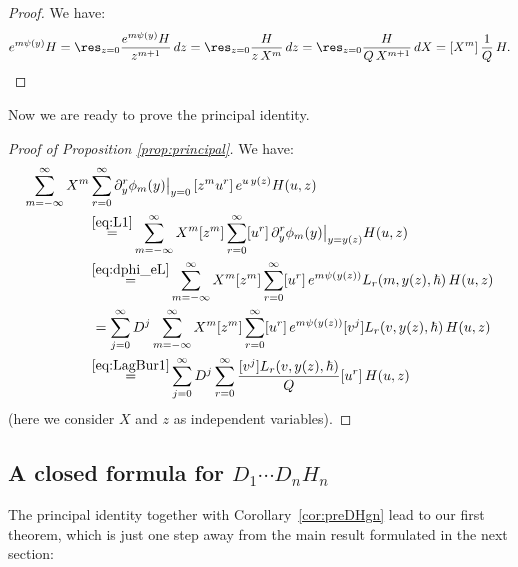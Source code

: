 \begin{proof} We have:
\begin{equation*}
[z^m] e^{m\psi(y)} H =
\res_{z=0} \frac{e^{m\psi(y)} H}{z^{m+1}}\,dz=\\
\res_{z=0} \frac{H}{z\,X^{m}}\,dz=
\res_{z=0} \frac{H}{Q\,X^{m+1}}\,dX= [X^m] \,\frac{1}{Q}\,H.\qedhere
\end{equation*}
\end{proof}

Now we are ready to prove the principal identity.

\begin{proof}[Proof of Proposition \ref{prop:principal}] We have:
\begin{align*}
\sum_{m=-\infty}^\infty X^{m}&\sum_{r=0}^\infty
\partial_y^{r}\phi_{m}(y)\big|_{y=0}\,[z^mu^r]\,
e^{u\,y(z)}H(u,z)
\\
&\mathop{=}^{\eqref{eq:L1}}
\sum_{m=-\infty}^\infty X^m[z^m]\sum_{r=0}^\infty [u^r]\,\partial_y^r\phi_m(y)\big|_{y=y(z)}H(u,z)
\\
&\mathop{=}^{\eqref{eq:dphi_eL}}\sum_{m=-\infty}^\infty X^m[z^m]\sum_{r=0}^\infty [u^r]\,
e^{m \psi(y(z))}L_r(m,y(z),\hbar)\,H(u,z)
\\
&\,=\sum_{j=0}^\infty D^j\sum_{m=-\infty}^\infty X^m[z^m]\sum_{r=0}^\infty [u^r]\,
e^{m \psi(y(z))}[v^j]L_r(v,y(z),\hbar)\,H(u,z)
\\
&\mathop{=}^{\eqref{eq:LagBur1}}\sum_{j=0}^\infty D^j\sum_{r=0}^\infty
\frac{[v^j]L_r(v,y(z),\hbar)}{Q}[u^r]\,H(u,z)
\end{align*}
(here we consider $X$ and $z$ as independent variables).
\end{proof}

\subsection{A closed formula for \texorpdfstring{$D_1\cdots D_n H_n$}{D1...DnHn}}

The principal identity together with Corollary~\ref{cor:preDHgn} lead to our first theorem, which is just one step away from the main result formulated in the next section:

